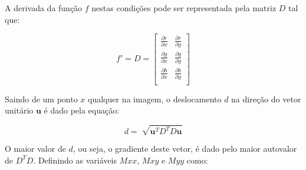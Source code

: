 
A derivada da função $f$ nestas condições pode ser representada pela matriz $D$ tal que:

$$ f' = D = \begin{bmatrix} 
\frac{\partial r}{\partial x} & \frac{\partial r}{\partial y} \\
\frac{\partial g}{\partial x} & \frac{\partial g}{\partial y} \\
\frac{\partial b}{\partial x} & \frac{\partial b}{\partial y} \\ 
\end{bmatrix} $$

Saindo de um ponto $x$ qualquer na imagem, o deslocamento $d$ na direção do vetor unitário $\textbf{u}$ é dado pela equação:

$$d = \sqrt[]{\textbf{u}^TD^TD\textbf{u}}$$

O maior valor de $d$, ou seja, o gradiente deste vetor, é dado pelo maior autovalor de $D^TD$. Definindo as variáveis $Mxx$, $Mxy$ e $Myy$ como:





